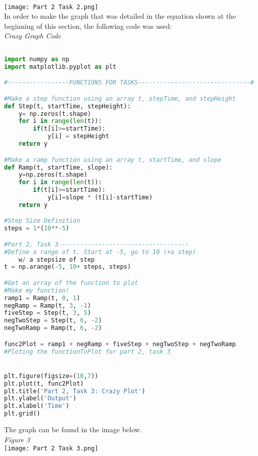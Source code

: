 \documentclass[12pt,a4paper]{article}
\begin{document}
\\\texttt{[image: Part 2 Task 2.png]}
\\
In order to make the graph that was detailed in the equation shown at the beginning of this section, the following code was used:\\
\textit{Crazy Graph Code}
\begin{lstlisting}[language=Python]
    
import numpy as np
import matplotlib.pyplot as plt

#-----------------FUNCTIONS FOR TASKS-------------------------------#

#Make a step function using an array t, stepTime, and stepHeight
def Step(t, startTime, stepHeight):
    y= np.zeros(t.shape)
    for i in range(len(t)):
        if(t[i]>=startTime):
            y[i] = stepHeight
    return y

#Make a ramp function using an array t, startTime, and slope
def Ramp(t, startTime, slope):
    y=np.zeros(t.shape)
    for i in range(len(t)):
        if(t[i]>=startTime):
            y[i]=slope * (t[i]-startTime)
    return y

#Step Size Definition
steps = 1*(10**-5)

#Part 2, Task 3------------------------------------
#Define a range of t. Start at -5, go to 10 (+a step) 
    w/ a stepsize of step
t = np.arange(-5, 10+ steps, steps)

#Get an array of the function to plot
#Make my function!
ramp1 = Ramp(t, 0, 1)
negRamp = Ramp(t, 3, -1)
fiveStep = Step(t, 3, 5)
negTwoStep = Step(t, 6, -2)
negTwoRamp = Ramp(t, 6, -2)

func2Plot = ramp1 + negRamp + fiveStep + negTwoStep + negTwoRamp
#Ploting the functionToPlot for part 2, task 3


plt.figure(figsize=(10,7))
plt.plot(t, func2Plot)
plt.title('Part 2, Task 3: Crazy Plot')
plt.ylabel('Output')
plt.xlabel('Time')
plt.grid()

\end{lstlisting}
The graph can be found in the image below.\\
\textit{Figure 3}
\\\texttt{[image: Part 2 Task 3.png]}
\end{document}
